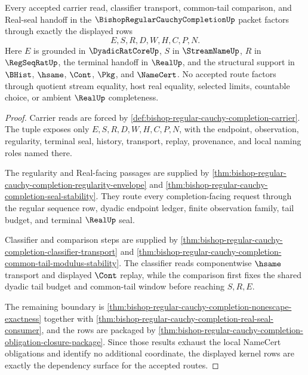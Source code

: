 \begin{theorem}
\label{thm:bishop-regular-cauchy-completion-scoped-kernel-route}
Every accepted carrier read, classifier transport, common-tail comparison, and Real-seal handoff in the $\BishopRegularCauchyCompletionUp$ packet factors through exactly the displayed rows
$$
E,S,R,D,W,H,C,P,N .
$$
Here $E$ is grounded in $\DyadicRatCoreUp$, $S$ in $\StreamNameUp$, $R$ in $\RegSeqRatUp$, the terminal handoff in $\RealUp$, and the structural support in $\BHist$, $\hsame$, $\Cont$, $\Pkg$, and $\NameCert$. No accepted route factors through quotient stream equality, host real equality, selected limits, countable choice, or ambient $\RealUp$ completeness.
\end{theorem}
\begin{proof}
Carrier reads are forced by \autoref{def:bishop-regular-cauchy-completion-carrier}. The tuple exposes only $E,S,R,D,W,H,C,P,N$, with the endpoint, observation, regularity, terminal seal, history, transport, replay, provenance, and local naming roles named there.

The regularity and Real-facing passages are supplied by \autoref{thm:bishop-regular-cauchy-completion-regularity-envelope} and \autoref{thm:bishop-regular-cauchy-completion-seal-stability}. They route every completion-facing request through the regular sequence row, dyadic endpoint ledger, finite observation family, tail budget, and terminal $\RealUp$ seal.

Classifier and comparison steps are supplied by \autoref{thm:bishop-regular-cauchy-completion-classifier-transport} and \autoref{thm:bishop-regular-cauchy-completion-common-tail-modulus-stability}. The classifier reads componentwise $\hsame$ transport and displayed $\Cont$ replay, while the comparison first fixes the shared dyadic tail budget and common-tail window before reaching $S,R,E$.

The remaining boundary is \autoref{thm:bishop-regular-cauchy-completion-nonescape-exactness} together with \autoref{thm:bishop-regular-cauchy-completion-real-seal-consumer}, and the rows are packaged by \autoref{thm:bishop-regular-cauchy-completion-obligation-closure-package}. Since those results exhaust the local NameCert obligations and identify no additional coordinate, the displayed kernel rows are exactly the dependency surface for the accepted routes.
\end{proof}

